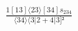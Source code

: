 \documentclass[varwidth, border=5pt]{standalone}
\begin{document}
\begin{my}
$\begin{gathered}
\scriptscriptstyle\frac{1[13]⟨23⟩[34]s_{234}}{⟨34⟩⟨3|2+4|3]²}
\end{gathered}$
\end{my}
\end{document}
